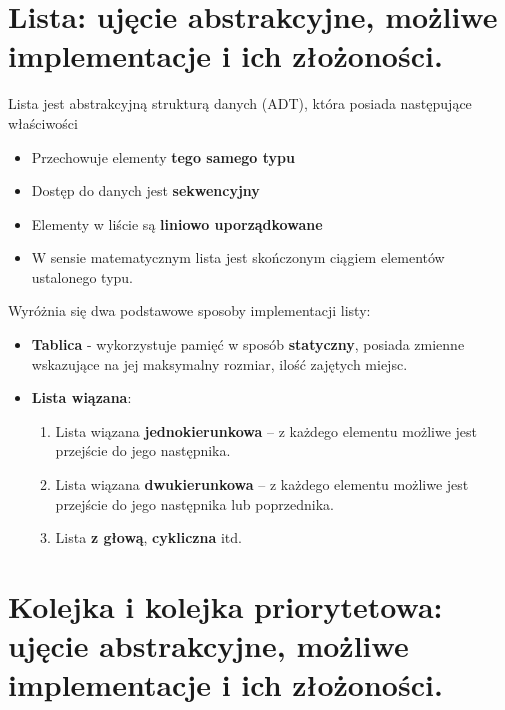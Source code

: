 \documentclass[main.tex]{subfiles}
\begin{document}
    \section{Lista: ujęcie abstrakcyjne, możliwe implementacje i ich złożoności.}
    \begin{definition}
        Lista jest abstrakcyjną strukturą danych (ADT), która posiada następujące właściwości
        \begin{itemize}[noitemsep]
            \item Przechowuje elementy \textbf{tego samego typu}
            \item Dostęp do danych jest \textbf{sekwencyjny}
            \item Elementy w liście są \textbf{liniowo uporządkowane}
            \item W sensie matematycznym lista jest skończonym ciągiem elementów ustalonego typu.
        \end{itemize}
    \end{definition}

    Wyróżnia się dwa podstawowe sposoby implementacji listy:
    \begin{itemize}
        \item \textbf{Tablica} - wykorzystuje pamięć w sposób \textbf{statyczny}, posiada zmienne wskazujące na jej
        maksymalny rozmiar, ilość zajętych miejsc.

        \item \textbf{Lista wiązana}:
        \begin{enumerate}
            \item Lista wiązana \textbf{jednokierunkowa} -- z każdego elementu możliwe jest przejście do jego następnika.
            \item Lista wiązana \textbf{dwukierunkowa} -- z każdego elementu możliwe jest przejście do jego następnika
            lub poprzednika.
            \item Lista \textbf{z głową}, \textbf{cykliczna} itd.
        \end{enumerate}
    \end{itemize}


    \section{Kolejka i kolejka priorytetowa: ujęcie abstrakcyjne, możliwe implementacje i ich złożoności.}
\end{document}
